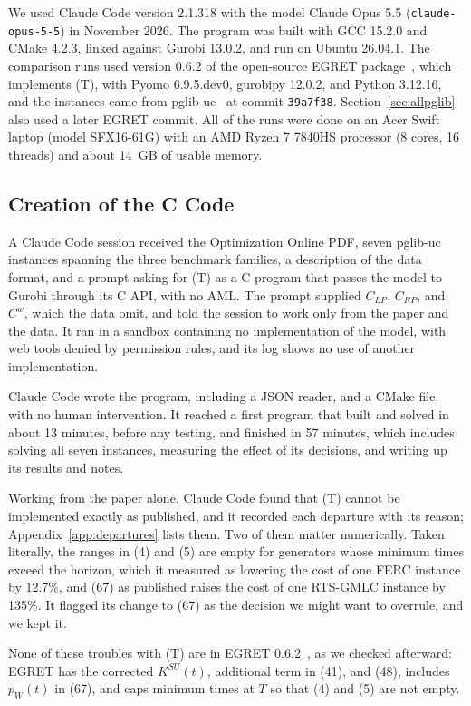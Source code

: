 \documentclass[11pt]{article}
\begin{document}
We used Claude Code version 2.1.318 with the model Claude Opus 5.5 (\texttt{claude-opus-5-5}) in November 2026. The program was built with GCC 15.2.0 and CMake 4.2.3, linked against Gurobi 13.0.2, and run on Ubuntu 26.04.1. The comparison runs used version 0.6.2 of the open-source EGRET package~\cite{egret}, which implements (T), with Pyomo 6.9.5.dev0, gurobipy 12.0.2, and Python 3.12.16, and the instances came from pglib-uc~\cite{pglibuc} at commit \texttt{39a7f38}. Section~\ref{sec:allpglib} also used a later EGRET commit. All of the runs were done on an Acer Swift laptop (model SFX16-61G) with an AMD Ryzen 7 7840HS processor (8 cores, 16 threads) and about 14~GB of usable memory.

\subsection{Creation of the C Code}
\label{sec:creation}

A Claude Code session received the Optimization Online PDF, seven pglib-uc instances spanning the three benchmark families, a description of the data format, and a prompt asking for (T) as a C program that passes the model to Gurobi through its C API, with no AML. The prompt supplied $C_{LP}$, $C_{RP}$, and $C^w$, which the data omit, and told the session to work only from the paper and the data. It ran in a sandbox containing no implementation of the model, with web tools denied by permission rules, and its log shows no use of another implementation.

Claude Code wrote the program, including a JSON reader, and a CMake file, with no human intervention. It reached a first program that built and solved in about 13 minutes, before any testing, and finished in 57 minutes, which includes solving all seven instances, measuring the effect of its decisions, and writing up its results and notes.

Working from the paper alone, Claude Code found that (T) cannot be implemented exactly as published, and it recorded each departure with its reason; Appendix~\ref{app:departures} lists them. Two of them matter numerically. Taken literally, the ranges in (4) and (5) are empty for generators whose minimum times exceed the horizon, which it measured as lowering the cost of one FERC instance by 12.7\%, and (67) as published raises the cost of one RTS-GMLC instance by 135\%. It flagged its change to (67) as the decision we might want to overrule, and we kept it.

None of these troubles with (T) are in EGRET 0.6.2~\cite{egret}, as we checked afterward: EGRET has the corrected $K^{SU}(t)$, additional term in (41), and (48), includes $p_W(t)$ in (67), and caps minimum times at $T$ so that (4) and (5) are not empty.
\end{document}
